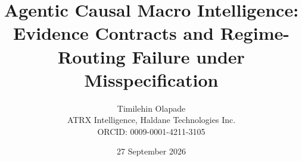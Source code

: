 \documentclass[10pt,letterpaper]{article}
\title{Agentic Causal Macro Intelligence: Evidence Contracts and Regime-Routing Failure under Misspecification}
\author{Timilehin Olapade\\ATRX Intelligence, Haldane Technologies Inc.\\\small ORCID: 0009-0001-4211-3105}
\date{27 September 2026}
\begin{document}
\maketitle
\begin{abstract}\end{abstract}

\clearpage


\clearpage\appendix
\end{document}
